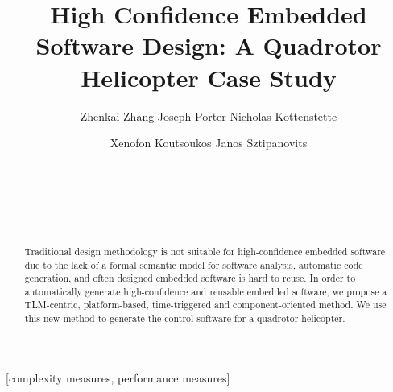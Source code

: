 \documentclass{acm_proc_article-sp}
\begin{document}
\title{High Confidence Embedded Software Design: A Quadrotor Helicopter Case Study}

\author{
\alignauthor Zhenkai Zhang
\alignauthor Joseph Porter
\alignauthor Nicholas Kottenstette
\and  %
\alignauthor Xenofon Koutsoukos
\alignauthor Janos Sztipanovits
\and
{}\\
\\
\\
\\
}






\maketitle
\begin{abstract}
Traditional design methodology is not suitable for high-confidence embedded software due to the lack of a formal semantic model for software analysis, automatic code generation, and often designed embedded software is hard to reuse. In order to automatically generate high-confidence and reusable embedded software, we propose a TLM-centric, platform-based, time-triggered and component-oriented method. We use this new method to generate the control software for a quadrotor helicopter.
\end{abstract}

[complexity measures, performance measures]


\end{document}
